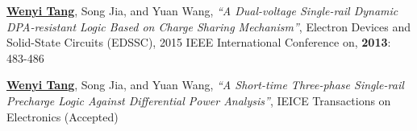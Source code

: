 
\noindent
[1] \textbf{\underline{Wenyi Tang}}, Song Jia, and Yuan Wang, \textit{``A Dual-voltage Single-rail Dynamic {DPA}-resistant Logic Based on Charge Sharing Mechanism''}, Electron Devices and Solid-State Circuits (EDSSC), 2015 IEEE International Conference on, \textbf{2013}: 483-486

\noindent
[2] \textbf{\underline{Wenyi Tang}}, Song Jia, and Yuan Wang, \textit{``A Short-time Three-phase Single-rail Precharge Logic Against Differential Power Analysis''}, IEICE Transactions on Electronics (Accepted)
